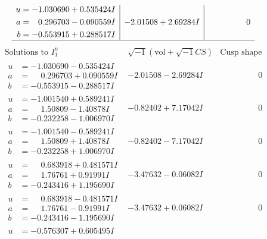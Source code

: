 \documentclass[1p]{elsarticle_modified}
\theoremstyle{definition}
\newcommand{\I}{\sqrt{-1}}
\begin{document}
$$\begin{array}{c|c|c}
\begin{aligned}
u &= -1.030690 + 0.535424 I \\
a &= \phantom{-}0.296703 - 0.090559 I \\
b &= -0.553915 + 0.288517 I\end{aligned}
 & -2.01508 + 2.69284 I & \phantom{-0.000000 } 0\\
 \hline 
 \end{array}$$\newpage$$\begin{array}{c|c|c}  
\text{Solutions to }I^u_{1}& \I (\text{vol} + \sqrt{-1}CS) & \text{Cusp shape}\\
 \hline 
\begin{aligned}
u &= -1.030690 - 0.535424 I \\
a &= \phantom{-}0.296703 + 0.090559 I \\
b &= -0.553915 - 0.288517 I\end{aligned}
 & -2.01508 - 2.69284 I & \phantom{-0.000000 } 0 \\ \hline\begin{aligned}
u &= -1.001540 + 0.589241 I \\
a &= \phantom{-}1.50809 - 1.40878 I \\
b &= -0.232258 - 1.006970 I\end{aligned}
 & -0.82402 + 7.17042 I & \phantom{-0.000000 } 0 \\ \hline\begin{aligned}
u &= -1.001540 - 0.589241 I \\
a &= \phantom{-}1.50809 + 1.40878 I \\
b &= -0.232258 + 1.006970 I\end{aligned}
 & -0.82402 - 7.17042 I & \phantom{-0.000000 } 0 \\ \hline\begin{aligned}
u &= \phantom{-}0.683918 + 0.481571 I \\
a &= \phantom{-}1.76761 + 0.91991 I \\
b &= -0.243416 + 1.195690 I\end{aligned}
 & -3.47632 - 0.06082 I & \phantom{-0.000000 } 0 \\ \hline\begin{aligned}
u &= \phantom{-}0.683918 - 0.481571 I \\
a &= \phantom{-}1.76761 - 0.91991 I \\
b &= -0.243416 - 1.195690 I\end{aligned}
 & -3.47632 + 0.06082 I & \phantom{-0.000000 } 0 \\ \hline\begin{aligned}
u &= -0.576307 + 0.605495 I \\

\end{aligned}
\end{array}$$
\end{document}
